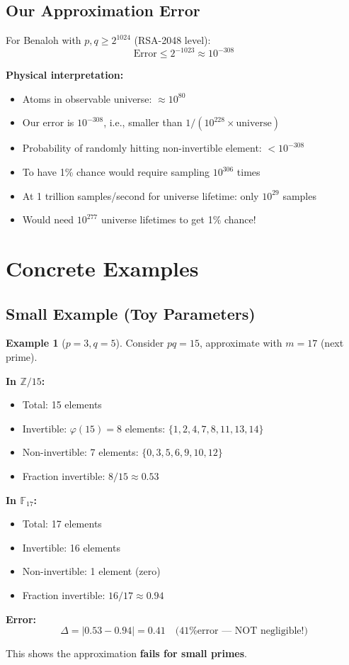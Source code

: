 \documentclass[11pt]{article}
\theoremstyle{definition}
\newtheorem{example}{Example}
\begin{document}
\subsection{Our Approximation Error}

For Benaloh with $p,q \geq 2^{1024}$ (RSA-2048 level):
\[
\text{Error} \leq 2^{-1023} \approx 10^{-308}
\]

\textbf{Physical interpretation:}
\begin{itemize}
\item Atoms in observable universe: $\approx 10^{80}$
\item Our error is $10^{-308}$, i.e., smaller than $1/(10^{228} \times \text{universe})$
\item Probability of randomly hitting non-invertible element: $< 10^{-308}$
\item To have 1\% chance would require sampling $10^{306}$ times
\item At 1 trillion samples/second for universe lifetime: only $10^{29}$ samples
\item Would need $10^{277}$ universe lifetimes to get 1\% chance!
\end{itemize}

\section{Concrete Examples}

\subsection{Small Example (Toy Parameters)}

\begin{example}[$p=3, q=5$]
Consider $pq = 15$, approximate with $m = 17$ (next prime).

\textbf{In $\mathbb{Z}/15$:}
\begin{itemize}
\item Total: 15 elements
\item Invertible: $\varphi(15) = 8$ elements: $\{1,2,4,7,8,11,13,14\}$
\item Non-invertible: 7 elements: $\{0,3,5,6,9,10,12\}$
\item Fraction invertible: $8/15 \approx 0.53$
\end{itemize}

\textbf{In $\mathbb{F}_{17}$:}
\begin{itemize}
\item Total: 17 elements
\item Invertible: 16 elements
\item Non-invertible: 1 element (zero)
\item Fraction invertible: $16/17 \approx 0.94$
\end{itemize}

\textbf{Error:}
\[
\Delta = |0.53 - 0.94| = 0.41 \quad \text{(41\% error --- NOT negligible!)}
\]

This shows the approximation \textbf{fails for small primes}.
\end{example}
\end{document}
